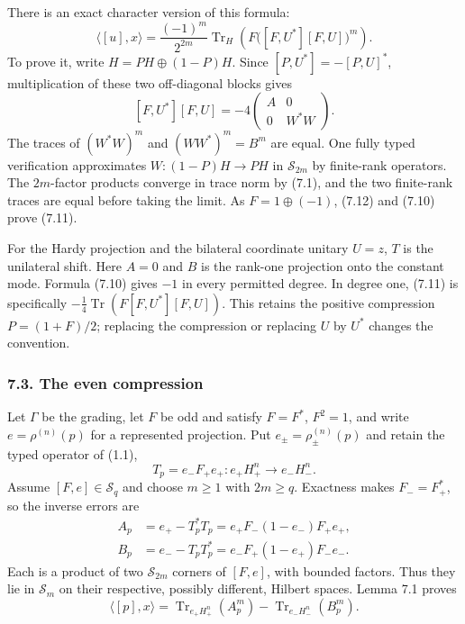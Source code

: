\documentclass[
  11pt,
]{article}
\begin{document}
There is an exact character version of this formula: \[
 \boxed{\quad
 \langle[u],x\rangle
  =\frac{(-1)^m}{2^{2m}}
     \operatorname{Tr}_H
       \left(F\bigl([F,U^*][F,U]\bigr)^m\right).
 \quad}
 \tag{7.11}
\] To prove it, write \(H=PH\oplus(1-P)H\). Since \([P,U^*]=-[P,U]^*\),
multiplication of these two off-diagonal blocks gives \[
 [F,U^*][F,U]=-4
       \begin{pmatrix}A&0\\0&W^*W\end{pmatrix}.
 \tag{7.12}
\] The traces of \((W^*W)^m\) and \((WW^*)^m=B^m\) are equal. One fully
typed verification approximates \(W:(1-P)H\to PH\) in
\(\mathcal S_{2m}\) by finite-rank operators. The \(2m\)-factor products
converge in trace norm by (7.1), and the two finite-rank traces are
equal before taking the limit. As \(F=1\oplus(-1)\), (7.12) and (7.10)
prove (7.11).

For the Hardy projection and the bilateral coordinate unitary \(U=z\),
\(T\) is the unilateral shift. Here \(A=0\) and \(B\) is the rank-one
projection onto the constant mode. Formula (7.10) gives \(-1\) in every
permitted degree. In degree one, (7.11) is specifically
\(-\frac14\operatorname{Tr}(F[F,U^*][F,U])\). This retains the positive
compression \(P=(1+F)/2\); replacing the compression or replacing \(U\)
by \(U^*\) changes the convention.

\subsubsection{7.3. The even compression}\label{the-even-compression-1}

Let \(\Gamma\) be the grading, let \(F\) be odd and satisfy \(F=F^*\),
\(F^2=1\), and write \(e=\rho^{(n)}(p)\) for a represented projection.
Put \(e_\pm=\rho_\pm^{(n)}(p)\) and retain the typed operator of (1.1),
\[
 T_p=e_-F_+e_+:e_+H_+^n\longrightarrow e_-H_-^n .
\] Assume \([F,e]\in\mathcal S_q\) and choose \(m\geq1\) with
\(2m\geq q\). Exactness makes \(F_-=F_+^*\), so the inverse errors are
\[
\begin{split}
 A_p&=e_+-T_p^*T_p
      =e_+F_-(1-e_-)F_+e_+,\\
 B_p&=e_--T_pT_p^*
      =e_-F_+(1-e_+)F_-e_- .
\end{split}
 \tag{7.13}
\] Each is a product of two \(\mathcal S_{2m}\) corners of \([F,e]\),
with bounded factors. Thus they lie in \(\mathcal S_m\) on their
respective, possibly different, Hilbert spaces. Lemma 7.1 proves \[
 \langle[p],x\rangle
    =\operatorname{Tr}_{e_+H_+^n}(A_p^m)
       -\operatorname{Tr}_{e_-H_-^n}(B_p^m).
 \tag{7.14}
\]
\end{document}

